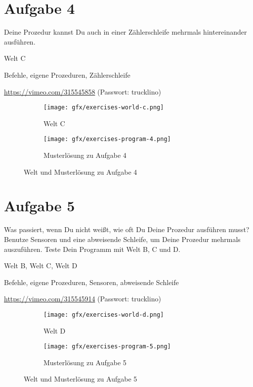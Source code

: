 \pagebreak

\section{Aufgabe 4}
\label{sec:exercises:4}

Deine Prozedur kannst Du auch in einer Zählerschleife mehrmals hintereinander ausführen.

\begin{description}[noitemsep]
  \item[Welt wählen:] Welt C
  \item[Du brauchst:] Befehle, eigene Prozeduren, Zählerschleife
  \item[Video:] \url{https://vimeo.com/315545858} (Passwort: trucklino)
\end{description}

\begin{figure}[H]
  \begin{subfigure}[b]{0.40\textwidth}
    \texttt{[image: gfx/exercises-world-c.png]}
    \caption{Welt C}
  \end{subfigure}\hfill
  \begin{subfigure}[b]{0.40\textwidth}
    \texttt{[image: gfx/exercises-program-4.png]}
    \caption{Musterlösung zu Aufgabe 4}
  \end{subfigure}\hfill
  \caption{Welt und Musterlösung zu Aufgabe 4}
\end{figure}

\pagebreak

\section{Aufgabe 5}
\label{sec:exercises:5}

Was passiert, wenn Du nicht weißt, wie oft Du Deine Prozedur ausführen musst? Benutze Sensoren und eine abweisende Schleife, um Deine Prozedur mehrmals auszuführen. Teste Dein Programm mit Welt B, C und D.

\begin{description}[noitemsep]
  \item[Welt wählen:] Welt B, Welt C, Welt D
  \item[Du brauchst:] Befehle, eigene Prozeduren, Sensoren, abweisende Schleife
  \item[Video:] \url{https://vimeo.com/315545914} (Passwort: trucklino)
\end{description}

\begin{figure}[H]
  \begin{subfigure}[b]{0.40\textwidth}
    \texttt{[image: gfx/exercises-world-d.png]}
    \caption{Welt D}
  \end{subfigure}\hfill
  \begin{subfigure}[b]{0.40\textwidth}
    \texttt{[image: gfx/exercises-program-5.png]}
    \caption{Musterlösung zu Aufgabe 5}
  \end{subfigure}\hfill
  \caption{Welt und Musterlösung zu Aufgabe 5}
\end{figure}

